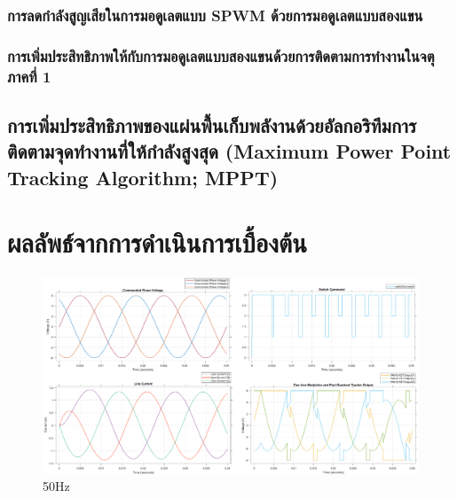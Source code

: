 \documentclass[11pt,a4paper]{article}
\begin{document}
\subsubsection{การลดกำลังสูญเสียในการมอดูเลตแบบ SPWM ด้วยการมอดูเลตแบบสองแขน}
\subsubsection{การเพิ่มประสิทธิภาพให้กับการมอดูเลตแบบสองแขนด้วยการติดตามการทำงานในจตุภาคที่ 1}
\subsection{การเพิ่มประสิทธิภาพของแผ่นพื้นเก็บพลังานด้วยอัลกอริทึมการติดตามจุดทำงานที่ให้กำลังสูงสุด (Maximum Power Point Tracking Algorithm; MPPT)}
\newpage
\section{ผลลัพธ์จากการดำเนินการเบื้องต้น}
\begin{figure}[!htb]
    \centering
    \includegraphics[width=\textwidth]{VSI_6V_50Hz_3Ohm_10mH.eps}
    \caption{50Hz}

\end{figure}

\end{document}
